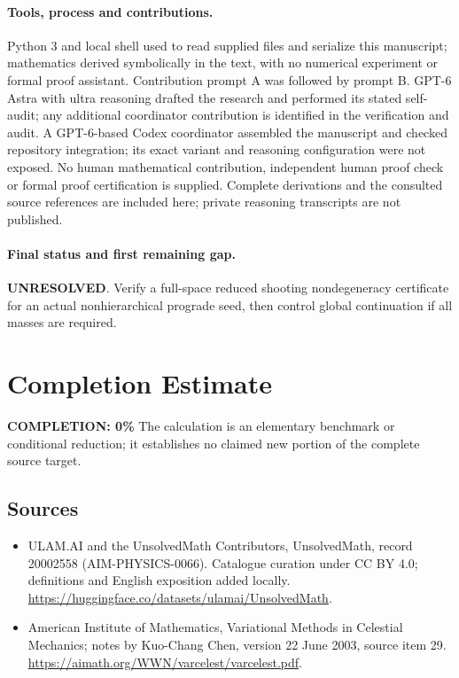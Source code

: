 \documentclass[11pt]{article}
\begin{document}
\paragraph{Tools, process and contributions.}
Python 3 and local shell used to read supplied files and serialize this manuscript; mathematics derived symbolically in the text, with no numerical experiment or formal proof assistant. Contribution prompt A was followed by prompt B. GPT-6 Astra with ultra reasoning drafted the research and performed its stated self-audit; any additional coordinator contribution is identified in the verification and audit. A GPT-6-based Codex coordinator assembled the manuscript and checked repository integration; its exact variant and reasoning configuration were not exposed. No human mathematical contribution, independent human proof check or formal proof certification is supplied. Complete derivations and the consulted source references are included here; private reasoning transcripts are not published.

\paragraph{Final status and first remaining gap.}
\textbf{UNRESOLVED}. Verify a full-space reduced shooting nondegeneracy certificate for an actual nonhierarchical prograde seed, then control global continuation if all masses are required.

\section{Completion Estimate}
\noindent\textbf{COMPLETION: 0\%}
The calculation is an elementary benchmark or conditional reduction; it establishes no claimed new portion of the complete source target.

\subsection{Sources}
\begin{itemize}
\item[\hypertarget{source:20002558:1}{S1}] ULAM.AI and the UnsolvedMath Contributors, UnsolvedMath, record 20002558 (AIM-PHYSICS-0066). Catalogue curation under CC BY 4.0; definitions and English exposition added locally.
\url{https://huggingface.co/datasets/ulamai/UnsolvedMath}.
\item[\hypertarget{source:20002558:2}{S2}] American Institute of Mathematics, Variational Methods in Celestial Mechanics; notes by Kuo-Chang Chen, version 22 June 2003, source item 29.
\url{https://aimath.org/WWN/varcelest/varcelest.pdf}.
\end{itemize}
\label{end:20002558}
\end{document}
